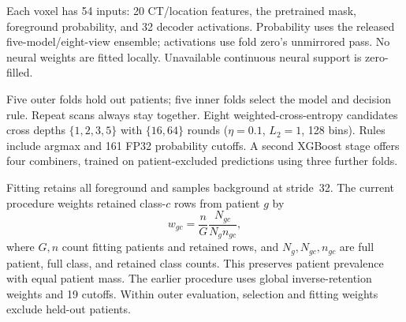 Each voxel has 54 inputs: 20 CT/location features, the pretrained mask, foreground probability, and 32 decoder activations. Probability uses the released five-model/eight-view ensemble; activations use fold zero's unmirrored pass. No neural weights are fitted locally. Unavailable continuous neural support is zero-filled.

Five outer folds hold out patients; five inner folds select the model and decision rule. Repeat scans always stay together. Eight weighted-cross-entropy candidates cross depths $\{1,2,3,5\}$ with $\{16,64\}$ rounds ($\eta=0.1$, $L_2=1$, 128 bins). Rules include argmax and 161 FP32 probability cutoffs. A second XGBoost stage offers four combiners, trained on patient-excluded predictions using three further folds.

Fitting retains all foreground and samples background at stride~32. The current procedure weights retained class-$c$ rows from patient $g$ by
\begin{equation}
 w_{gc}=\frac{n}{G}\frac{N_{gc}}{N_g n_{gc}},
\end{equation}
where $G,n$ count fitting patients and retained rows, and $N_g,N_{gc},n_{gc}$ are full patient, full class, and retained class counts. This preserves patient prevalence with equal patient mass. The earlier procedure uses global inverse-retention weights and 19 cutoffs. Within outer evaluation, selection and fitting weights exclude held-out patients.


\newpage
